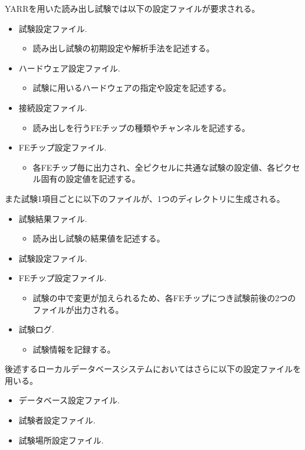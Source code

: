 YARRを用いた読み出し試験では以下の設定ファイルが要求される。
\begin{itemize}
  \item 試験設定ファイル.
  \begin{itemize}
    \item 読み出し試験の初期設定や解析手法を記述する。
  \end{itemize}
  \item ハードウェア設定ファイル.
  \begin{itemize}
    \item 試験に用いるハードウェアの指定や設定を記述する。
  \end{itemize}
  \item 接続設定ファイル.
  \begin{itemize}
    \item 読み出しを行うFEチップの種類やチャンネルを記述する。
  \end{itemize}  
  \item FEチップ設定ファイル.
  \begin{itemize}
    \item 各FEチップ毎に出力され、全ピクセルに共通な試験の設定値、各ピクセル固有の設定値を記述する。
  \end{itemize}  
\end{itemize}

また試験1項目ごとに以下のファイルが、1つのディレクトリに生成される。
\begin{itemize}
  \item 試験結果ファイル.
  \begin{itemize}
    \item 読み出し試験の結果値を記述する。
  \end{itemize}
  \item 試験設定ファイル.
  \item FEチップ設定ファイル.
  \begin{itemize}
    \item 試験の中で変更が加えられるため、各FEチップにつき試験前後の2つのファイルが出力される。
  \end{itemize}
  \item 試験ログ.
  \begin{itemize}
    \item 試験情報を記録する。
  \end{itemize}
\end{itemize}

後述するローカルデータベースシステムにおいてはさらに以下の設定ファイルを用いる。
\begin{itemize}
  \item データベース設定ファイル.
  \item 試験者設定ファイル. 
  \item 試験場所設定ファイル.
\end{itemize}


